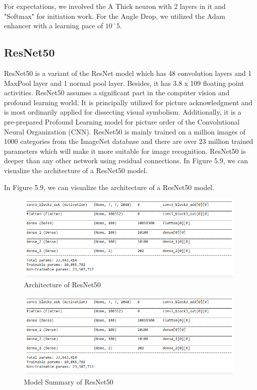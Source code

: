 \vspace{5mm}
\noindent For expectations, we involved the A Thick neuron with 2 layers in it and "Softmax" for initiation work. For the Angle Drop, we utilized the Adam enhancer with a learning pace of \(10^-5\).

\subsection{ResNet50}
ResNet50 is a variant of the ResNet model which has 48 convolution layers and 1 MaxPool layer and 1 normal pool layer. Besides, it has 3.8 x 109 floating point activities. ResNet50 assumes a significant part in the computer vision and profound learning world. It is principally utilized for picture acknowledgment and is most ordinarily applied for dissecting visual symbolism. Additionally, it is a pre-prepared Profound Learning model for picture order of the Convolutional Neural Organization (CNN).  ResNet50 is mainly trained on a million images of 1000 categories from the ImageNet database and there are over 23 million trained parameters which will make it more suitable for image recognition. ResNet50 is deeper than any other network using residual connections. In Figure 5.9, we can visualize the architecture of a ResNet50 model.

\vspace{5mm}
\noindent In Figure 5.9, we can visualize the architecture of a ResNet50 model.

\vspace{5mm}
\begin{figure}[hbt!]
\centering
\includegraphics[scale=0.45]{images/resnet50.png}
\caption{Architecture of ResNet50}
\label{fig:x Model Summary of ResNet50}
\end{figure}

\vspace{5mm}
\begin{figure}[hbt!]
\centering
\includegraphics[scale=0.7]{images/ResNet50.PNG}
\caption{Model Summary of ResNet50}
\label{fig:x Model Summary of ResNet50}
\end{figure}

